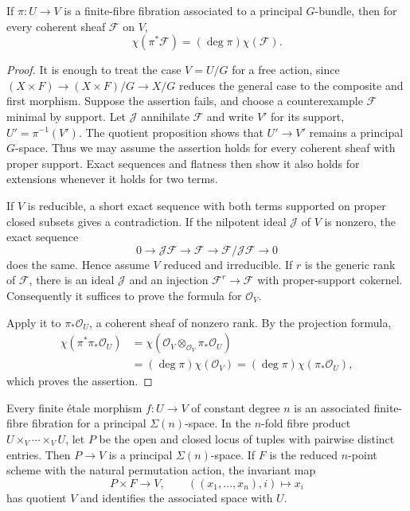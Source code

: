 \begin{theorem}
\label{mumford-thm-euler-associated-fibration}
If $\pi:U\to V$ is a finite-fibre fibration associated to a principal
$G$-bundle, then for every coherent sheaf $\mathcal F$ on $V$,
\[
\chi(\pi^*\mathcal F)=(\deg\pi)\chi(\mathcal F).
\]
\end{theorem}
\begin{proof}
It is enough to treat the case $V=U/G$ for a free action, since
$(X\times F)\to(X\times F)/G\to X/G$ reduces the general case to the
composite and first morphism. Suppose the assertion fails, and choose a
counterexample $\mathcal F$ minimal by support. Let $\mathcal J$ annihilate
$\mathcal F$ and write $V'$ for its support, $U'=\pi^{-1}(V')$. The quotient
proposition shows that $U'\to V'$ remains a principal $G$-space. Thus we
may assume the assertion holds for every coherent sheaf with proper support.
Exact sequences and flatness then show it also holds for extensions whenever
it holds for two terms.

If $V$ is reducible, a short exact sequence with both terms supported on
proper closed subsets gives a contradiction. If the nilpotent ideal
$\mathcal J$ of $V$ is nonzero, the exact sequence
\[
0\to\mathcal J\mathcal F\to\mathcal F\to
\mathcal F/\mathcal J\mathcal F\to0
\]
does the same. Hence assume $V$ reduced and irreducible. If $r$ is the
generic rank of $\mathcal F$, there is an ideal $\mathcal J$ and an
injection $\mathcal F^r\to\mathcal F$ with proper-support cokernel.
Consequently it suffices to prove the formula for $\mathcal O_V$.

Apply it to $\pi_*\mathcal O_U$, a coherent sheaf of nonzero rank. By the
projection formula,
\[
\begin{aligned}
\chi(\pi^*\pi_*\mathcal O_U)
 &=\chi(\mathcal O_V\otimes_{\mathcal O_V}\pi_*\mathcal O_U)\\
 &=(\deg\pi)\chi(\mathcal O_V)
 =(\deg\pi)\chi(\pi_*\mathcal O_U),
\end{aligned}
\]
which proves the assertion.
\end{proof}

\begin{remark}
\label{mumford-rem-symmetric-associated-space}
Every finite étale morphism $f:U\to V$ of constant degree $n$ is an
associated finite-fibre fibration for a principal $\Sigma(n)$-space. In the
$n$-fold fibre product $U\times_V\cdots\times_VU$, let $P$ be the open and
closed locus of tuples with pairwise distinct entries. Then $P\to V$ is a
principal $\Sigma(n)$-space. If $F$ is the reduced $n$-point scheme with
the natural permutation action, the invariant map
\[
P\times F\longrightarrow V,
\qquad ((x_1,\ldots,x_n),i)\longmapsto x_i
\]
has quotient $V$ and identifies the associated space with $U$.
\end{remark}

